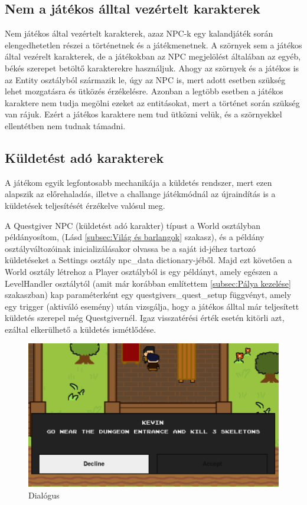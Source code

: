 \subsection{Nem a játékos álltal vezértelt karakterek}
 Nem játékos által vezértelt karakterek, azaz NPC-k egy kalandjáték során elengedhetetlen részei a történetnek és a játékmenetnek. A szörnyek sem a játékos által vezérelt karakterek, de a játékokban az NPC megjelölést általában az egyéb, békés szerepet betöltő karakterekre használjuk. Ahogy az szörnyek és a játékos is az Entity osztályból származik le, úgy az NPC is, mert adott esetben szükség lehet mozgatásra és ütközés érzékelésre. Azonban a legtöbb esetben a játékos karaktere nem tudja megölni ezeket az entitásokat, mert a történet során szükség van rájuk. Ezért a játékos karaktere nem tud ütközni velük, és a szörnyekkel ellentétben nem tudnak támadni.


\subsection{Küldetést adó karakterek}

 A játékom egyik legfontosabb mechanikája a küldetés rendszer, mert ezen alapszik az előrehaladás, illetve a challange játékmódnál az újraindítás is a küldetések teljesítését érzékelve valósul meg. 

A Questgiver NPC (küldetést adó karakter) típust a World osztályban példányosítom, (Lásd \ref{subsec:Világ és barlangok} szakasz), és
 a példány osztályváltozóinak inicializálásakor olvassa be a saját id-jéhez tartozó küldetéseket a Settings osztály npc\_data dictionary-jéből.
  Majd ezt követően a World osztály létrehoz a Player osztályból is egy példányt,
   amely egészen a LevelHandler osztálytól (amit már korábban említettem \ref{subsec:Pálya kezelése} szakaszban) kap
    paraméterként egy questgivers\_quest\_setup függvényt, amely egy trigger (aktiváló esemény) után vizsgálja,
     hogy a játékos álltal már teljesített küldetés szerepel még Questgivernél. Igaz visszatérési érték esetén kitörli azt,
      ezáltal elkerülhető a küldetés ismétlődése. 
       \begin{figure}[H]
        \centering
        \includegraphics[width=12.0truecm]{images/dialogue.png}
        \caption{Dialógus}
        \label{fig:Dialógus rendszer}
    \end{figure}
    
